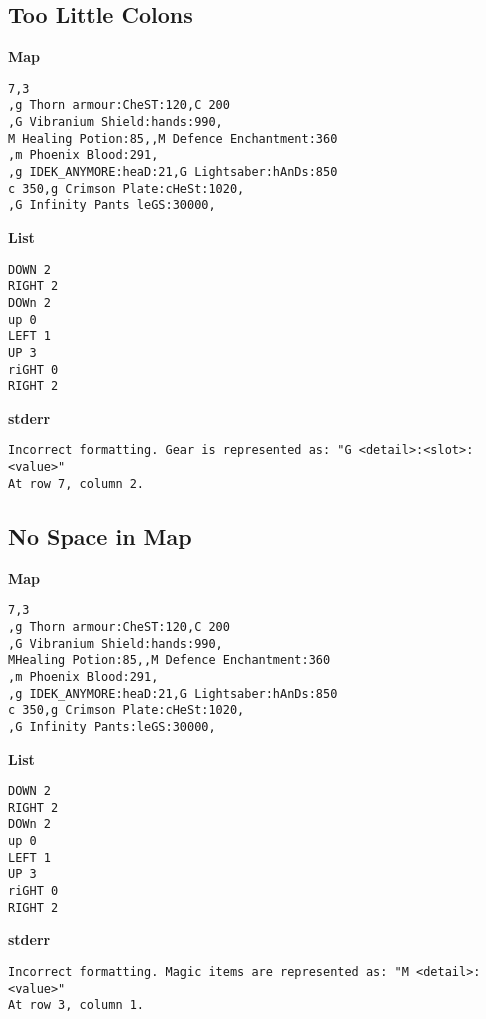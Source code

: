 \documentclass{article}
\begin{document}
\subsection{Too Little Colons}

\quad \textbf{Map}
\begin{lstlisting}
7,3
,g Thorn armour:CheST:120,C 200
,G Vibranium Shield:hands:990,
M Healing Potion:85,,M Defence Enchantment:360
,m Phoenix Blood:291,
,g IDEK_ANYMORE:heaD:21,G Lightsaber:hAnDs:850
c 350,g Crimson Plate:cHeSt:1020,
,G Infinity Pants leGS:30000,
\end{lstlisting}

\textbf{List}
\begin{lstlisting}
DOWN 2
RIGHT 2
DOWn 2
up 0
LEFT 1
UP 3
riGHT 0
RIGHT 2
\end{lstlisting}
\pagebreak

\textbf{stderr}
\begin{lstlisting}
Incorrect formatting. Gear is represented as: "G <detail>:<slot>:<value>"
At row 7, column 2.
\end{lstlisting}

\subsection{No Space in Map}

\quad \textbf{Map}
\begin{lstlisting}
7,3
,g Thorn armour:CheST:120,C 200
,G Vibranium Shield:hands:990,
MHealing Potion:85,,M Defence Enchantment:360
,m Phoenix Blood:291,
,g IDEK_ANYMORE:heaD:21,G Lightsaber:hAnDs:850
c 350,g Crimson Plate:cHeSt:1020,
,G Infinity Pants:leGS:30000,
\end{lstlisting}

\textbf{List}
\begin{lstlisting}
DOWN 2
RIGHT 2
DOWn 2
up 0
LEFT 1
UP 3
riGHT 0
RIGHT 2
\end{lstlisting}
\pagebreak

\textbf{stderr}
\begin{lstlisting}
Incorrect formatting. Magic items are represented as: "M <detail>:<value>"
At row 3, column 1.
\end{lstlisting}
\end{document}
